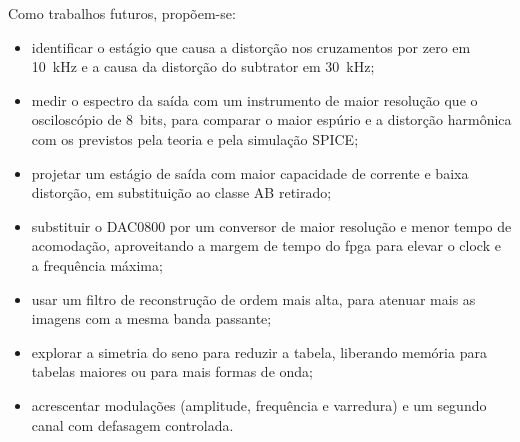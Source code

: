 Como trabalhos futuros, propõem-se:
\begin{itemize}
	\item identificar o estágio que causa a distorção nos cruzamentos por zero em 10~kHz e a causa da distorção do subtrator em 30~kHz;
	\item medir o espectro da saída com um instrumento de maior resolução que o osciloscópio de 8~bits, para comparar o maior espúrio e a distorção harmônica com os previstos pela teoria e pela simulação SPICE;
	\item projetar um estágio de saída com maior capacidade de corrente e baixa distorção, em substituição ao classe AB retirado;
	\item substituir o DAC0800 por um conversor de maior resolução e menor tempo de acomodação, aproveitando a margem de tempo do \ac{fpga} para elevar o clock e a frequência máxima;
	\item usar um filtro de reconstrução de ordem mais alta, para atenuar mais as imagens com a mesma banda passante;
	\item explorar a simetria do seno para reduzir a tabela, liberando memória para tabelas maiores ou para mais formas de onda;
	\item acrescentar modulações (amplitude, frequência e varredura) e um segundo canal com defasagem controlada.
\end{itemize}

